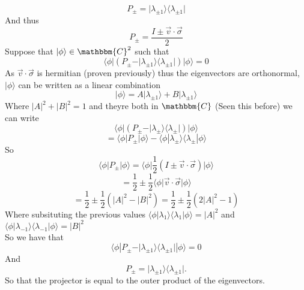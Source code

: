 \documentclass[12pt]{article}
\newcommand{\ket}[1]{\vert{#1}\rangle}
\newcommand{\bra}[1]{\langle{#1}\vert}
\begin{document}
\begin{enumerate}
$$ P_{\pm} = \ket{\lambda_{\pm 1}} \bra{\lambda_{\pm 1}} $$ 
And thus 
$$ P_{\pm} = \frac{I\pm \vec{v}\cdot \vec{\sigma}}{2} $$
Suppose that $\ket{\phi} \in \mathbbm{C}^2$ such that
$$ \bra{\phi} (P_{\pm} - \ket{\lambda_{\pm 1}} \bra{\lambda_{\pm 1}}) \ket{\phi} = 0 $$
As $\vec{v} \cdot \vec{\sigma}$ is hermitian (proven previously) thus the eigenvectors are orthonormal, $\ket{\phi}$ can be written as a linear combination 
$$ \ket{\phi} = A \ket{\lambda_{\pm 1}} + B \ket{\lambda_{\pm 1}} $$
Where $|A|^2 + |B|^2 =1 $ and theyre both in $\mathbbm{C}$ (Seen this before) we can write 
$$ \bra{\phi} (P_{\pm} - \ket{\lambda_{\pm}} \bra{\lambda_{\pm}}) \ket{\phi} $$
$$ = \bra{\phi} P_{\pm} \ket{\phi} - \langle \phi | \lambda_{\pm} \rangle \langle \lambda_{\pm} | \phi \rangle $$
So 
$$ \bra{\phi} P_{\pm} \ket{\phi} = \bra{\phi} \frac{1}{2} ( I \pm \vec{v} \cdot \vec{\sigma}) \ket{\phi} $$
$$ = \frac{1}{2} \pm \frac{1}{2} \bra{\phi} \vec{v} \cdot \vec{\sigma} \ket{\phi} $$
$$ = \frac{1}{2} \pm \frac{1}{2} (|A|^2 - |B|^2 ) = \frac{1}{2} \pm \frac{1}{2} (2|A|^2 - 1) $$
Where subsituting the previous values $\langle \phi | \lambda_1 \rangle \langle \lambda_1 | \phi \rangle = |A|^2 $ and $\langle \phi | \lambda_{-1} \rangle \langle \lambda_{-1} | \phi \rangle = |B|^2 $
\\
So we have that 
$$ \langle \phi | P_{\pm} - \ket{\lambda_{\pm 1}} \bra{\lambda_{\pm 1}} | \phi \rangle  =0 $$
And 
$$ P_{\pm} = \ket{\lambda_{\pm 1}} \bra{\lambda_{\pm 1}}.$$
So that the projector is equal to the outer product of the eigenvectors. 


\end{enumerate}
\end{document}
